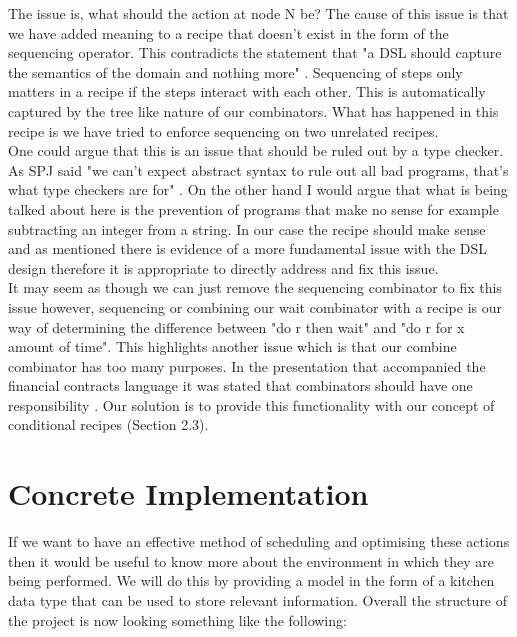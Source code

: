 \documentclass[11pt]{article}
\begin{document}
    The issue is, what should the action at node N be? The cause of this issue is
    that we have added meaning to a recipe that doesn't exist in the form of the sequencing
    operator. This contradicts the statement that "a DSL should capture the semantics of the
    domain and nothing more" \cite{hudak}. Sequencing of steps only matters in a recipe if
    the steps interact with each other. This is automatically captured by the tree like nature
    of our combinators. What has happened in this recipe is we have tried to enforce sequencing
    on two unrelated recipes. \\

    One could argue that this is an issue that should be ruled out by a type checker. As SPJ
    said "we can’t expect abstract syntax to rule out all bad programs, that’s what type
    checkers are for" \cite{core}. On the other hand I would argue that what is being talked
    about here is the prevention of programs that make no sense for example subtracting an integer
    from a string. In our case the recipe should make sense and as mentioned there is evidence
    of a more fundamental issue with the DSL design therefore it is appropriate to directly address
    and fix this issue. \\
    
    It may seem as though we can just remove the sequencing combinator to fix this issue however,
    sequencing or combining our wait combinator with a recipe is our way of determining the
    difference between "do r then wait" and "do r for x amount of time". This highlights another
    issue which is that our combine combinator has too many purposes. In the presentation that
    accompanied the financial contracts language it was stated that combinators should have
    one responsibility \cite{contracts-pp}. Our solution is to provide this functionality 
    with our concept of conditional recipes (Section 2.3). \\

    \section{Concrete Implementation}

    If we want to have an effective method of scheduling and optimising these actions then it would
    be useful to know more about the environment in which they are being performed. We will do this
    by providing a model in the form of a kitchen data type that can be used to store relevant
    information. Overall the structure of the project is now looking something like the following:
    
\end{document}
